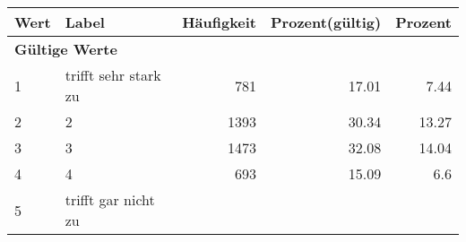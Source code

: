      \begin{longtable}{lXrrr}
     \toprule
     \textbf{Wert} & \textbf{Label} & \textbf{Häufigkeit} & \textbf{Prozent(gültig)} & \textbf{Prozent} \\
     \endhead
     \midrule
     \multicolumn{5}{l}{\textbf{Gültige Werte}}\\

     1 &
     \multicolumn{1}{X}{ trifft sehr stark zu   } &


       \num{781} &
       \num[round-mode=places,round-precision=2]{17.01} &
         \num[round-mode=places,round-precision=2]{7.44} \\

     2 &
     \multicolumn{1}{X}{ 2   } &


       \num{1393} &
       \num[round-mode=places,round-precision=2]{30.34} &
         \num[round-mode=places,round-precision=2]{13.27} \\

     3 &
     \multicolumn{1}{X}{ 3   } &


       \num{1473} &
       \num[round-mode=places,round-precision=2]{32.08} &
         \num[round-mode=places,round-precision=2]{14.04} \\

     4 &
     \multicolumn{1}{X}{ 4   } &


       \num{693} &
       \num[round-mode=places,round-precision=2]{15.09} &
         \num[round-mode=places,round-precision=2]{6.6} \\

     5 &
     \multicolumn{1}{X}{ trifft gar nicht zu   } &



\end{longtable}
